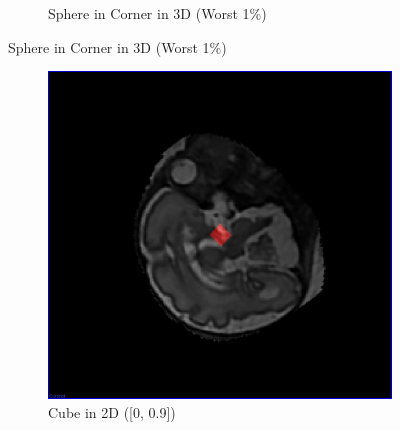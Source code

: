 \begin{figure}[H]
\begin{subfigure}[b]{0.5\textwidth}
    \caption{Sphere in Corner in 3D (Worst 1$\%$)}
    \label{fig:thresholdingresultsspherecorner3d}
  \end{subfigure}
\end{figure}

\begin{figure}[H]
  \ContinuedFloat 
  \centering
  \begin{subfigure}[b]{0.5\textwidth}
    \includegraphics[width=\textwidth]{images/thresholding/results/cube_2d.png}
    \caption{Cube in 2D ([0, 0.9])}
    \label{fig:thresholdingresultscube2d}
  \end{subfigure}%
  ~ %
  \begin{subfigure}[b]{0.5\textwidth}

\end{subfigure}
\end{figure}
